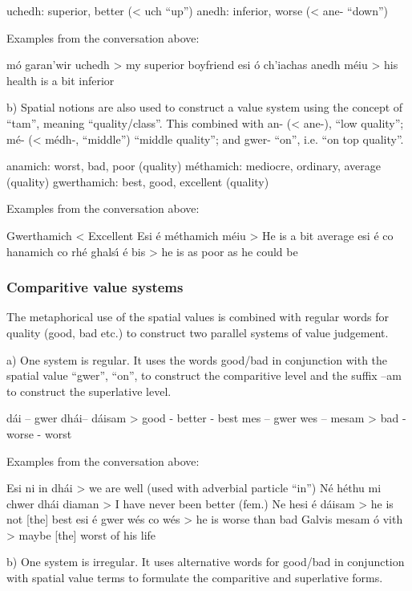         uchedh: superior, better (< uch “up”)
         anedh: inferior, worse (< ane- “down”)

Examples from the conversation above:

m\'{o} garan’wir uchedh > my superior boyfriend
esi \'{o} ch’iachas anedh m\'{e}iu > his health is a bit inferior

b) Spatial notions are also used to construct a value system using the concept of “tam”, meaning “quality/class”. This combined with an- (< ane-), “low quality”; m\'{e}- (< m\'{e}dh-, “middle”) “middle quality”; and gwer- “on”, i.e. “on top quality”.

         anamich: worst, bad, poor (quality) 
        m\'{e}thamich: mediocre, ordinary, average (quality) 
        gwerthamich: best, good, excellent (quality) 

Examples from the conversation above:

Gwerthamich < Excellent
Esi \'{e} m\'{e}thamich m\'{e}iu > He is a bit average
esi \'{e} co hanamich co rh\'{e} ghals\'{\i} \'{e} bis > he is as poor as he could be


\subsubsection{Comparitive value systems}

The metaphorical use of the spatial values is combined with regular words for quality (good, bad etc.) to construct two parallel systems of value judgement. 

a) One system is regular. It uses the words good/bad in conjunction with the spatial value “gwer”, “on”, to construct the comparitive level and the suffix –am to construct the superlative level.

        d\'{a}i – gwer dh\'{a}i– d\'{a}isam > good - better - best
        mes – gwer wes – mesam > bad - worse - worst

Examples from the conversation above:

Esi ni in dh\'{a}i > we are well (used with adverbial particle “in”)
N\'{e} h\'{e}thu mi chwer dh\'{a}i diaman > I have never been better (fem.)
Ne hesi \'{e} d\'{a}isam > he is not [the] best
esi \'{e} gwer w\'{e}s co w\'{e}s > he is worse than bad
Galvis mesam \'{o} vith > maybe [the] worst of his life

b) One system is irregular. It uses alternative words for good/bad in conjunction with spatial value terms to formulate the comparitive and superlative forms.

